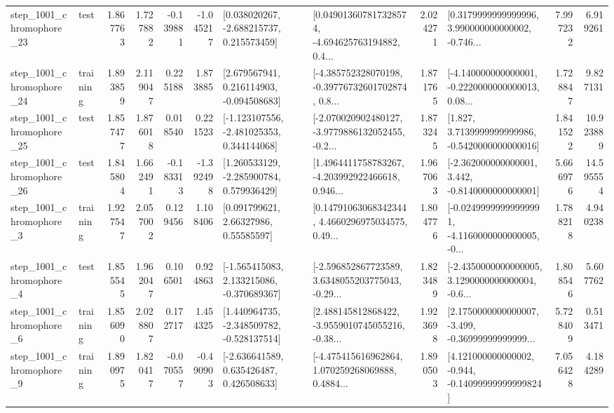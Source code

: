 \begin{tabular}{llrrrrllrlrr}
 step\_1001\_chromophore\_23 &      test &      1.867763 &    1.727882 &     -0.139881 & -1.045217 &    [0.038020267, -2.688215737, 0.215573459] &  [0.049013607817328574, -4.694625763194882, 0.4... &       2.024271 &  [0.3179999999999996, 3.990000000000002, -0.746... &            7.997232 &          6.919261 \\
 step\_1001\_chromophore\_24 &  training &      1.893859 &    2.119047 &      0.225188 &  1.873885 &    [2.679567941, 0.216114903, -0.094508683] &  [-4.385752328070198, -0.39776732601702874, 0.8... &       1.871765 &  [-4.140000000000001, -0.2220000000000013, 0.08... &            1.728847 &          9.827131 \\
 step\_1001\_chromophore\_25 &      test &      1.857477 &    1.876018 &      0.018540 &  0.221523 &   [-1.123107556, -2.481025353, 0.344144068] &  [-2.070020902480127, -3.9779886132052455, -0.2... &       1.873245 &   [1.827, 3.7139999999999986, -0.5420000000000016] &            1.841522 &         10.923889 \\
 step\_1001\_chromophore\_26 &      test &      1.845804 &    1.662491 &     -0.183313 & -1.392498 &    [1.260533129, -2.285900784, 0.579936429] &  [1.4964411758783267, -4.203992922466618, 0.946... &       1.967063 &   [-2.362000000000001, 3.442, -0.8140000000000001] &            5.666976 &         14.595554 \\
  step\_1001\_chromophore\_3 &  training &      1.927547 &    2.057002 &      0.129456 &  1.108406 &       [0.091799621, 2.66327986, 0.55585597] &  [0.14791063068342344, 4.4660296975034575, 0.49... &       1.804776 &  [-0.02499999999999991, -4.1160000000000005, -0... &            1.788218 &          4.940238 \\
  step\_1001\_chromophore\_4 &      test &      1.855545 &    1.962047 &      0.106501 &  0.924863 &   [-1.565415083, 2.133215086, -0.370689367] &  [-2.596852867723589, 3.6348055203775043, -0.29... &       1.823489 &  [-2.4350000000000005, 3.1290000000000004, -0.6... &            1.808546 &          5.607762 \\
  step\_1001\_chromophore\_6 &  training &      1.856090 &    2.028807 &      0.172717 &  1.454325 &   [1.440964735, -2.348509782, -0.528137514] &  [2.488145812868422, -3.9559010745055216, -0.38... &       1.923698 &  [2.1750000000000007, -3.499, -0.36999999999999... &            5.728409 &          0.513471 \\
  step\_1001\_chromophore\_9 &  training &      1.890975 &    1.820417 &     -0.070557 & -0.490903 &    [-2.636641589, 0.635426487, 0.426508633] &  [-4.475415616962864, 1.070259268069888, 0.4884... &       1.890503 &  [4.121000000000002, -0.944, -0.14099999999999824] &            7.056428 &          4.184289 \\

\end{tabular}
